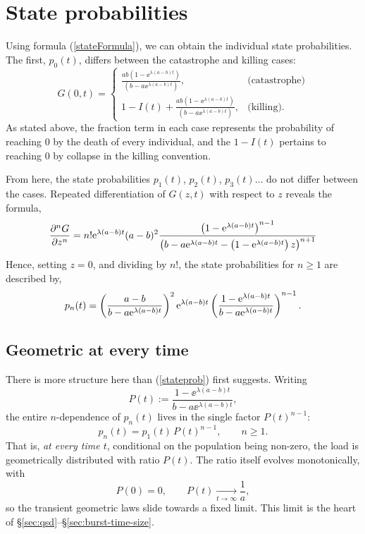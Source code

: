 \section{State probabilities}
\label{sec:state-probs}

Using formula (\ref{stateFormula}), we can obtain the individual state
probabilities. The first, $p_0(t)$, differs between the catastrophe and
killing cases:
$$G(0 , t) = \begin{cases}
\frac{ab(1-\ee^{\lambda(a-b) t})  } {  (b-a\ee^{\lambda(a-b) t})   }, & \text{(catastrophe)}\\
1 - I(t) + \frac{ab(1-\ee^{\lambda(a-b) t})  } {  (b-a\ee^{\lambda(a-b) t})   }, & \text{(killing).}
\end{cases}$$
As stated above, the fraction term in each case represents the probability
of reaching $0$ by the death of every individual, and the $1-I(t)$ pertains
to reaching $0$ by collapse in the killing convention. \par
From here, the state probabilities $p_1(t)$, $p_2(t)$, $p_3(t)\dots$ do not
differ between the cases. Repeated differentiation of $G(z,t)$ with respect
to $z$ reveals the formula,
$$\frac{\partial^n G}{\partial z^n} =n! {\rm e}^{\lambda(a-b)t}(a-b)^2  \frac{\left(1-{\rm e}^{\lambda(a-b)t}\right)^ {n-1} }{\left( b - a{\rm e}^{\lambda(a-b)t} - \left(1-{\rm e}^{\lambda(a-b)t}\right) z\right) ^ {n+1}} $$
Hence, setting $z=0$, and dividing by $n!$, the state probabilities for
$n\geq1$ are described by,
\begin{equation}
\label{stateprob}
p_n(t) =\left( \frac{ a-b }{{b - a{\rm e}^{\lambda(a-b)t}}}\right)^2 {\rm e}^{\lambda(a-b)t} \left(\frac{{1-{\rm e}^{\lambda(a-b)t}}}{{b - a{\rm e}^{\lambda(a-b)t}} } \right)^{n-1}.
\end{equation}

\subsection{Geometric at every time}
\label{sec:geometric-every-time}

There is more structure here than (\ref{stateprob}) first suggests. Writing
\begin{equation}
P(t):=\frac{1-\ee^{\lambda(a-b)t}}{b-a\ee^{\lambda(a-b)t}},
\label{eq:Pdef}
\end{equation}
the entire $n$-dependence of $p_n(t)$ lives in the single factor
$P(t)^{n-1}$:
\begin{equation}
p_n(t)=p_1(t)\,P(t)^{n-1},\qquad n\ge1.
\end{equation}
That is, \emph{at every time $t$}, conditional on the population being
non-zero, the load is geometrically distributed with ratio $P(t)$. The ratio
itself evolves monotonically, with
\begin{equation}
P(0)=0,\qquad P(t)\xrightarrow[t\to\infty]{}\frac{1}{a},
\end{equation}
so the transient geometric laws slide towards a fixed limit. This limit is
the heart of \S\ref{sec:qsd}--\S\ref{sec:burst-time-size}.

